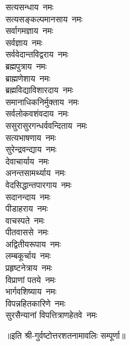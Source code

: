 \begin{flushleft}
\begin{multicols}{2}
सत्यसन्धाय~नमः\\
सत्यसङ्कल्पमानसाय~नमः\\
सर्वागमज्ञाय~नमः\\
सर्वज्ञाय~नमः\\
सर्ववेदान्तविद्वराय~नमः\\
ब्रह्मपुत्राय~नमः\hfill{}\\
ब्राह्मणेशाय~नमः\\
ब्रह्मविद्याविशारदाय~नमः\\
समानाधिकनिर्मुक्ताय~नमः\\
सर्वलोकवशंवदाय~नमः\\
ससुरासुरगन्धर्ववन्दिताय~नमः\\
सत्यभाषणाय~नमः\\
सुरेन्द्रवन्द्याय~नमः\\
देवाचार्याय~नमः\\
अनन्तसामर्थ्याय~नमः\\
वेदसिद्धान्तपारगाय~नमः\hfill{}\\
सदानन्दाय~नमः\\
पीडाहराय~नमः\\
वाचस्पते~नमः\\
पीतवाससे~नमः\\
अद्वितीयरूपाय~नमः\\
लम्बकूर्चाय~नमः\\
प्रहृष्टनेत्राय~नमः\\
विप्राणां पतये~नमः\\
भार्गवशिष्याय~नमः\\
विपन्नहितकारिणे~नमः\\
सुरसैन्यानां विपत्तित्राणहेतवे~नमः\\
\end{multicols}
\end{flushleft}
॥इति श्री-गुर्वष्टोत्तरशतनामावलिः सम्पूर्णा॥

